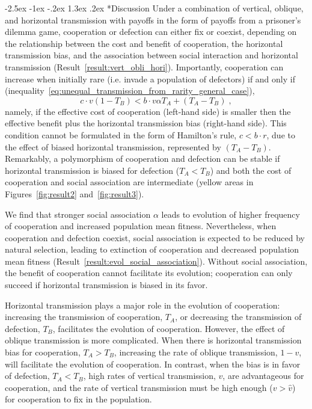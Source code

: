 \documentclass[12pt]{extarticle}
\makeatletter
\renewcommand\section{\@startsection {section}{1}{\z@}%
     {-2.5ex \@plus -1ex \@minus -.2ex}%
     {1.3ex \@plus.2ex}%
    {\Large\bfseries}}
\makeatother
\begin{document}
\section*{Discussion}
Under a combination of vertical, oblique, and horizontal transmission with payoffs in the form of payoffs from a prisoner's dilemma game, cooperation or defection can either fix or coexist, depending on the relationship between the cost and benefit of cooperation, the horizontal transmission bias, and the association between social interaction and horizontal transmission (Result~\ref{result:vert_obli_hori}).
Importantly, cooperation can increase when initially rare (i.e. invade a population of defectors) if and only if (inequality~\ref{eq:unequal_transmission_from_rarity_general_case}),
\begin{equation}
c \cdot v (1-T_B) < b \cdot v \alpha T_A + (T_A - T_B) \;,
\end{equation}
namely, if the effective cost of cooperation (left-hand side) is smaller then the effective benefit plus the horizontal transmission bias (right-hand side).
This condition cannot be formulated in the form of Hamilton's rule, $c<b \cdot r$, due to the effect of biased horizontal transmission, represented by $(T_A-T_B)$.
Remarkably, a polymorphism of cooperation and defection can be stable if horizontal transmission is biased for defection ($T_A<T_B$) and both the cost of cooperation and social association are intermediate (yellow areas in Figures~\ref{fig:result2} and~\ref{fig:result3}).

We find that stronger social association $\alpha$ leads to evolution of higher frequency of cooperation and increased population mean fitness.
Nevertheless, when cooperation and defection coexist, social association is expected to be reduced by natural selection, leading to extinction of cooperation and decreased population mean fitness (Result~\ref{result:evol_social_association}).
Without social association, the benefit of cooperation cannot facilitate its evolution; cooperation can only succeed if horizontal transmission is biased in its favor. 

Horizontal transmission plays a major role in the evolution of cooperation: increasing the transmission of cooperation, $T_A$, or decreasing the transmission of defection, $T_B$, facilitates the evolution of cooperation. 
However, the effect of oblique transmission is more complicated.
When there is horizontal transmission bias for cooperation, $T_A>T_B$, increasing the rate of oblique transmission, $1-v$, will facilitate the evolution of cooperation.
In contrast, when the bias is in favor of defection, $T_A<T_B$, high rates of vertical transmission, $v$, are advantageous for cooperation, and the rate of vertical transmission must be high enough ($v>\hat v$) for cooperation to fix in the population.
\end{document}
